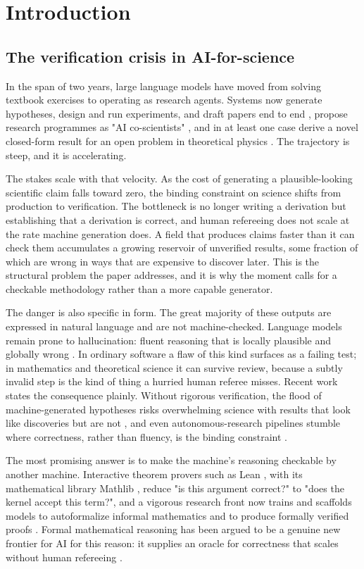 \documentclass[11pt]{article}
\begin{document}
\section{Introduction}

\subsection{The verification crisis in AI-for-science}

In the span of two years, large language models have moved from solving textbook exercises to
operating as research agents. Systems now generate hypotheses, design and run experiments, and
draft papers end to end \cite{r1,r2}, propose research programmes as "AI co-scientists" \cite{r3}, and in at
least one case derive a novel closed-form result for an open problem in theoretical physics \cite{r4}.
The trajectory is steep, and it is accelerating.

The stakes scale with that velocity. As the cost of generating a plausible-looking scientific
claim falls toward zero, the binding constraint on science shifts from production to verification.
The bottleneck is no longer writing a derivation but establishing that a derivation is correct, and
human refereeing does not scale at the rate machine generation does. A field that produces claims
faster than it can check them accumulates a growing reservoir of unverified results, some fraction
of which are wrong in ways that are expensive to discover later. This is the structural problem the
paper addresses, and it is why the moment calls for a checkable methodology rather than a more
capable generator.

The danger is also specific in form. The great majority of these outputs are expressed in natural
language and are not machine-checked. Language models remain prone to hallucination: fluent
reasoning that is locally plausible and globally wrong \cite{r5}. In ordinary software a flaw of this
kind surfaces as a failing test; in mathematics and theoretical science it can survive review,
because a subtly invalid step is the kind of thing a hurried human referee misses. Recent work
states the consequence plainly. Without rigorous verification, the flood of machine-generated
hypotheses risks overwhelming science with results that look like discoveries but are not \cite{r6}, and
even autonomous-research pipelines stumble where correctness, rather than fluency, is the binding
constraint \cite{r7}.

The most promising answer is to make the machine's reasoning checkable by another machine.
Interactive theorem provers such as Lean \cite{r38}, with its mathematical library Mathlib \cite{r39}, reduce "is this
argument correct?" to "does the kernel accept this term?", and a vigorous research front now trains
and scaffolds models to autoformalize informal mathematics and to produce formally verified
proofs \cite{r8,r9,r10}. Formal mathematical reasoning has been argued to be a genuine new frontier for
AI for this reason: it supplies an oracle for correctness that scales without human refereeing \cite{r11}.
\end{document}
